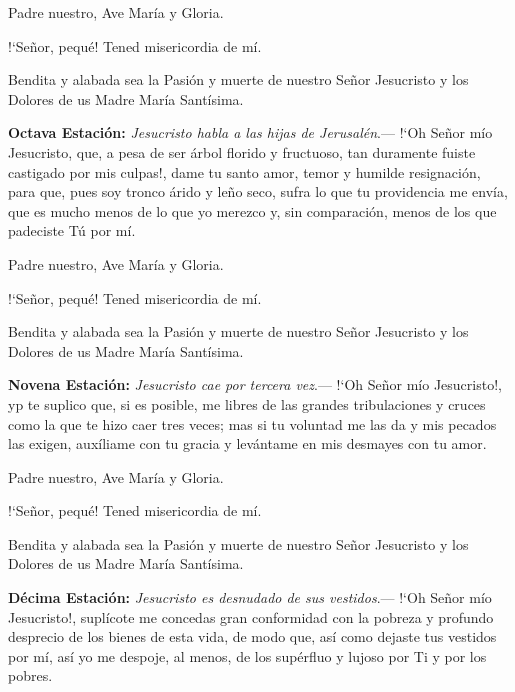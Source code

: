 \documentclass[10pt]{article}
\begin{document}
\begin{multicols}{2}
      Padre nuestro, Ave María y Gloria.

      {!`}Señor, pequé! Tened misericordia de mí.

      Bendita y alabada sea la Pasión y muerte de nuestro Señor Jesucristo y los Dolores de us Madre María Santísima.

      \vspace{2mm}

      \textbf{Octava Estación:} \textit{Jesucristo habla a las hijas de Jerusalén}.--- {!`}Oh Señor mío Jesucristo, que, a pesa de ser árbol florido y fructuoso, tan duramente fuiste castigado
      por mis culpas!, dame tu santo amor, temor y humilde resignación, para que, pues soy tronco árido y leño seco, sufra lo que tu providencia me envía, que es mucho menos de lo que yo 
      merezco y, sin comparación, menos de los que padeciste Tú por mí. 

      \vspace{2mm}

      Padre nuestro, Ave María y Gloria.

      {!`}Señor, pequé! Tened misericordia de mí.

      Bendita y alabada sea la Pasión y muerte de nuestro Señor Jesucristo y los Dolores de us Madre María Santísima.

      \vspace{2mm}

      \textbf{Novena Estación:} \textit{Jesucristo cae por tercera vez}.--- {!`}Oh Señor mío Jesucristo!, yp te suplico que, si es posible, me libres de las grandes tribulaciones y cruces como la
      que te hizo caer tres veces; mas si tu voluntad me las da y mis pecados las exigen, auxíliame con tu gracia y levántame en mis desmayes con tu amor.

      \vspace{2mm}

      Padre nuestro, Ave María y Gloria.

      {!`}Señor, pequé! Tened misericordia de mí.

      Bendita y alabada sea la Pasión y muerte de nuestro Señor Jesucristo y los Dolores de us Madre María Santísima.

      \vspace{2mm}

      \textbf{Décima Estación:} \textit{Jesucristo es desnudado de sus vestidos}.--- {!`}Oh Señor mío Jesucristo!, suplícote me concedas gran conformidad con la pobreza y profundo desprecio de los
      bienes de esta vida, de modo que, así como dejaste tus vestidos por mí, así yo me despoje, al menos, de los supérfluo y lujoso por Ti y por los pobres.


\end{multicols}
\end{document}
